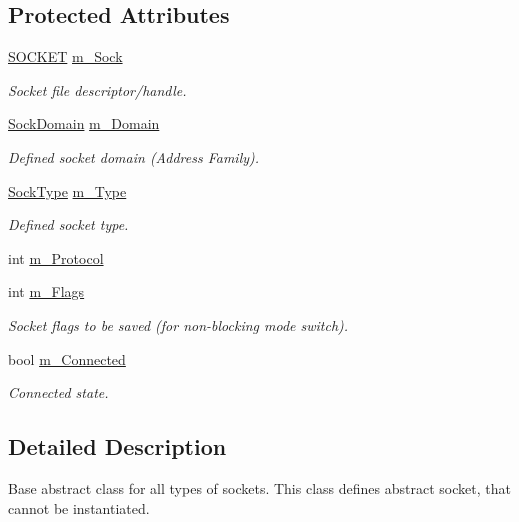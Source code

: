 \subsection*{Protected Attributes}
\begin{DoxyCompactItemize}
\item 
\hyperlink{sockclasslib_8h_a8dc8083897335125630f1af5dafd5831}{S\+O\+C\+K\+ET} \hyperlink{classSocketClass_a77d848dafefa82afa5defbf2d82f7290}{m\+\_\+\+Sock}
\begin{DoxyCompactList}\small\item\em Socket file descriptor/handle. \end{DoxyCompactList}\item 
\hyperlink{classSocketClass_ac940413abaa7328db8518a9f121babb6}{Sock\+Domain} \hyperlink{classSocketClass_a42a3afe9243529dce5144b8cc5ebf82c}{m\+\_\+\+Domain}
\begin{DoxyCompactList}\small\item\em Defined socket domain (Address Family). \end{DoxyCompactList}\item 
\hyperlink{classSocketClass_a2182dd9fee09459fabb99e6ae717f595}{Sock\+Type} \hyperlink{classSocketClass_af838a669bfdae0c7b87be6504ec1b0dc}{m\+\_\+\+Type}
\begin{DoxyCompactList}\small\item\em Defined socket type. \end{DoxyCompactList}\item 
int \hyperlink{classSocketClass_ac22407bcd7ecf8b439d7f3b543e9db38}{m\+\_\+\+Protocol}
\item 
int \hyperlink{classSocketClass_aba4d44a061616e2f56d2797418af510c}{m\+\_\+\+Flags}
\begin{DoxyCompactList}\small\item\em Socket flags to be saved (for non-\/blocking mode switch). \end{DoxyCompactList}\item 
bool \hyperlink{classSocketClass_aad81b86c88c024b5ccc77d89cbaea8e8}{m\+\_\+\+Connected}
\begin{DoxyCompactList}\small\item\em Connected state. \end{DoxyCompactList}\end{DoxyCompactItemize}


\subsection{Detailed Description}
Base abstract class for all types of sockets. This class defines abstract socket, that cannot be instantiated. 

